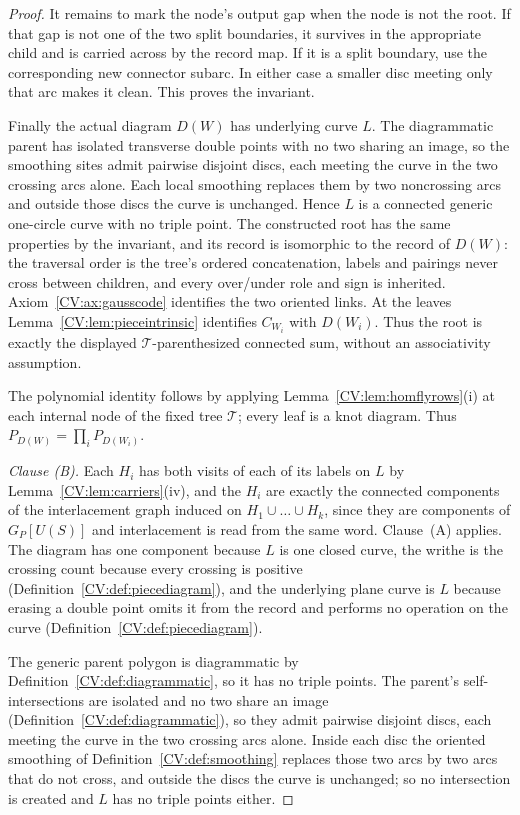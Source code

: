 \begin{proof}
It remains to mark the node's output gap when the node is not the root. If that
gap is not one of the two split boundaries, it survives in the appropriate
child and is carried across by the record map. If it is a split boundary, use
the corresponding new connector subarc. In either case a smaller disc meeting
only that arc makes it clean. This proves the invariant.

Finally the actual diagram $D(W)$ has underlying curve $L$. The diagrammatic
parent has isolated transverse double points with no two sharing an image, so
the smoothing sites admit pairwise disjoint discs, each meeting the curve in
the two crossing arcs alone. Each local smoothing replaces them by two
noncrossing arcs and outside those discs the curve is unchanged. Hence $L$ is
a connected generic one-circle curve with no triple point. The constructed
root has the same properties by the invariant, and its record is isomorphic to
the record of $D(W)$: the traversal order is the tree's ordered concatenation,
labels and pairings never cross between children, and every over/under role and
sign is inherited. Axiom~\ref{CV:ax:gausscode} identifies the two oriented links.
At the leaves Lemma~\ref{CV:lem:pieceintrinsic} identifies $C_{W_i}$ with
$D(W_i)$. Thus the root is exactly the displayed
$\mathcal T$-parenthesized connected sum, without an associativity assumption.

The polynomial identity follows by applying
Lemma~\ref{CV:lem:homflyrows}(i) at each internal node of the fixed tree
$\mathcal T$; every leaf is a knot diagram. Thus
$P_{D(W)}=\prod_iP_{D(W_i)}$.

\emph{Clause (B).}
Each $H_i$ has both visits of each of its labels on $L$ by
Lemma~\ref{CV:lem:carriers}(iv), and the $H_i$ are exactly the connected
components of the interlacement graph induced on $H_1\cup\dots\cup H_k$, since
they are components of $G_P[U(S)]$ and interlacement is read from the same
word. Clause~(A) applies. The diagram has one component
because $L$ is one closed curve, the writhe is the crossing count because every
crossing is positive (Definition~\ref{CV:def:piecediagram}), and the underlying
plane curve is $L$ because erasing a double point omits it from the record and
performs no operation on the curve (Definition~\ref{CV:def:piecediagram}).

The generic parent polygon is diagrammatic by
Definition~\ref{CV:def:diagrammatic}, so it has no triple points.  The parent's
self-intersections are isolated and no two share an image
(Definition~\ref{CV:def:diagrammatic}), so they admit pairwise disjoint discs,
each meeting the curve in the two crossing arcs alone.  Inside each disc the
oriented smoothing of Definition~\ref{CV:def:smoothing} replaces those two arcs
by two arcs that do not cross, and outside the discs the curve is unchanged;
so no intersection is created and $L$ has no triple points either.


\end{proof}
